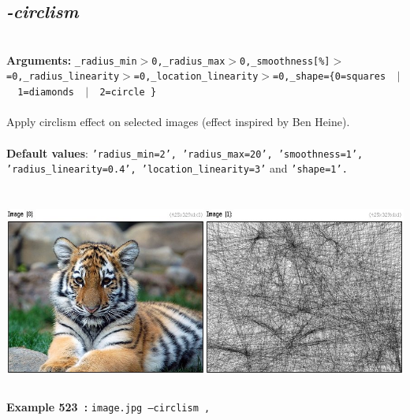 \documentclass[a4paper,11pt,twoside]{book}
\begin{document}
\subsection{\emph{-circlism} }\vspace*{-0.5em}
~\\\textbf{Arguments: } 
{\small \texttt{\_radius\_min$>$0,\_radius\_max$>$0,\_smoothness[\%]$>$=0,\_radius\_linearity$>$=0,\_location\_linearity$>$=0,\_shape=\{0=squares ~$|$~ 1=diamonds ~$|$~ 2=circle \}}}\\~\\
Apply circlism effect on selected images (effect inspired by Ben Heine).
~\\~\\\textbf{Default values}: {\small \texttt{'radius\_min=2', 'radius\_max=20', 'smoothness=1', 'radius\_linearity=0.4', 'location\_linearity=3'} and \texttt{'shape=1'.}}
\begin{center}\includegraphics[keepaspectratio=true,height=7cm,width=\textwidth]{img/gmic_def523.jpg}\\
{\footnotesize \textbf{Example 523~:} \texttt{image.jpg --circlism ,}}
\end{center}
\end{document}
